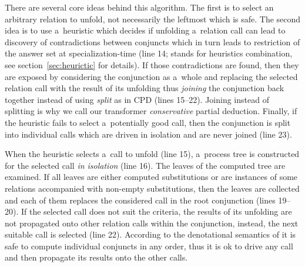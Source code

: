 
There are several core ideas behind this algorithm.
The first is to select an arbitrary relation to unfold, not necessarily the leftmost which is safe.
The second idea is to use a~heuristic which decides if unfolding a~relation call can lead to discovery of contradictions between conjuncts which in turn leads to restriction of the answer set at specialization-time (line 14;  stands for heuristics combination, see section~\ref{sec:heurictic} for details).
If those contradictions are found, then they are exposed by considering the conjunction as a~whole and replacing the selected relation call with the result of its unfolding thus \emph{joining} the conjunction back together instead of using \emph{split} as in CPD (lines 15--22).
Joining instead of splitting is why we call our transformer \emph{conservative} partial deduction.
Finally, if the heuristic fails to select a~potentially good call, then the conjunction is split into individual calls which are driven in isolation and are never joined (line 23).

When the heuristic selects a~call to unfold (line 15), a~process tree is constructed for the selected call \emph{in isolation} (line 16).
The leaves of the computed tree are examined.
If all leaves are either computed substitutions or are instances of some relations accompanied with non-empty substitutions, then the leaves are collected and each of them replaces the considered call in the root conjunction (lines 19--20).
If the selected call does not suit the criteria, the results of its unfolding are not propagated onto other relation calls within the conjunction, instead, the next suitable call is selected (line 22).
According to the denotational semantics of \mk{} it is safe to compute individual conjuncts in any order, thus it is ok to drive any call and then propagate its results onto the other calls.


